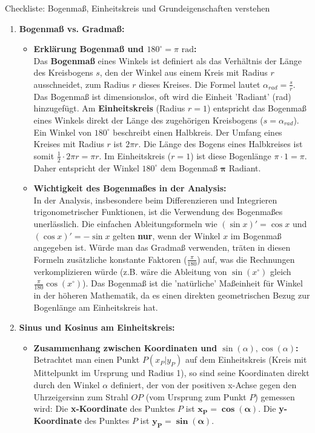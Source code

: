 \begin{loesungsumgebung}{Checkliste: Bogenmaß, Einheitskreis und Grundeigenschaften verstehen}

\begin{enumerate}[label=(\alph*)]
    \item \textbf{Bogenmaß vs. Gradmaß:}
    \begin{itemize}
        \item \textbf{Erklärung Bogenmaß und $180^\circ = \pi \text{ rad}$:} \\
        Das \textbf{Bogenmaß} eines Winkels ist definiert als das Verhältnis der Länge des Kreisbogens $s$, den der Winkel aus einem Kreis mit Radius $r$ ausschneidet, zum Radius $r$ dieses Kreises. Die Formel lautet $\alpha_{rad} = \frac{s}{r}$. Das Bogenmaß ist dimensionslos, oft wird die Einheit 'Radiant' (rad) hinzugefügt.
        Am \textbf{Einheitskreis} (Radius $r=1$) entspricht das Bogenmaß eines Winkels direkt der Länge des zugehörigen Kreisbogens ($s=\alpha_{rad}$).
        Ein Winkel von $180^\circ$ beschreibt einen Halbkreis. Der Umfang eines Kreises mit Radius $r$ ist $2\pi r$. Die Länge des Bogens eines Halbkreises ist somit $\frac{1}{2} \cdot 2\pi r = \pi r$. Im Einheitskreis ($r=1$) ist diese Bogenlänge $\pi \cdot 1 = \pi$. Daher entspricht der Winkel $180^\circ$ dem Bogenmaß $\mathbf{\pi}$ Radiant.

        \item \textbf{Wichtigkeit des Bogenmaßes in der Analysis:} \\
        In der Analysis, insbesondere beim Differenzieren und Integrieren trigonometrischer Funktionen, ist die Verwendung des Bogenmaßes unerlässlich. Die einfachen Ableitungsformeln wie $(\sin x)' = \cos x$ und $(\cos x)' = -\sin x$ gelten \textbf{nur}, wenn der Winkel $x$ im Bogenmaß angegeben ist. Würde man das Gradmaß verwenden, träten in diesen Formeln zusätzliche konstante Faktoren ($\frac{\pi}{180}$) auf, was die Rechnungen verkomplizieren würde (z.B. wäre die Ableitung von $\sin(x^\circ)$ gleich $\frac{\pi}{180}\cos(x^\circ)$). Das Bogenmaß ist die 'natürliche' Maßeinheit für Winkel in der höheren Mathematik, da es einen direkten geometrischen Bezug zur Bogenlänge am Einheitskreis hat.
    \end{itemize}

    \item \textbf{Sinus und Kosinus am Einheitskreis:}
    \begin{itemize}
        \item \textbf{Zusammenhang zwischen Koordinaten und $\sin(\alpha), \cos(\alpha)$:} \\
        Betrachtet man einen Punkt $P(x_P|y_P)$ auf dem Einheitskreis (Kreis mit Mittelpunkt im Ursprung und Radius 1), so sind seine Koordinaten direkt durch den Winkel $\alpha$ definiert, der von der positiven x-Achse gegen den Uhrzeigersinn zum Strahl $OP$ (vom Ursprung zum Punkt $P$) gemessen wird:
        Die \textbf{x-Koordinate} des Punktes $P$ ist $\mathbf{x_P = \cos(\alpha)}$.
        Die \textbf{y-Koordinate} des Punktes $P$ ist $\mathbf{y_P = \sin(\alpha)}$.


\end{itemize}
\end{enumerate}
\end{loesungsumgebung}
